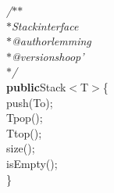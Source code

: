 {{\def\dash{\raise2.1pt\hbox{\rule{5pt}{0.3pt}}\hspace{1pt}}\begin{tabbing}
{\it{/$\ast$$\ast$}}\\
{\it{\hspace{6pt}$\ast$\hspace{6pt}Stack\hspace{6pt}interface}}\\
{\it{\hspace{6pt}$\ast$\hspace{6pt}@author\hspace{6pt}lemming}}\\
{\it{\hspace{6pt}$\ast$\hspace{6pt}@version\hspace{6pt}shoop{'}}}\\
{\it{\hspace{6pt}$\ast$/}}\\
{\textbf{public}}\hspace{6pt}Stack$<$T$>$\hspace{6pt}\{\\
\hspace{6pt}push(T\hspace{6pt}o);\\
\hspace{6pt}T\hspace{6pt}pop();\\
\hspace{6pt}T\hspace{6pt}top();\\
\hspace{6pt}size();\\
\hspace{6pt}isEmpty();\\
\}
\end{tabbing}}}
